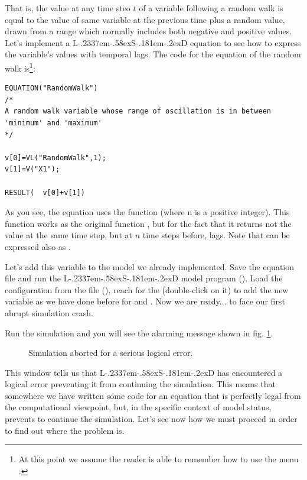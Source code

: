 \documentclass [11pt,a4paper] {book}
\def\LsD{{L\kern-.2337em\lower-.58ex\hbox{S}\kern-.181em\lower-.2ex\hbox{D}}\xspace}
\begin{document}
That is, the value at any time steo $t$ of a variable following a random walk is equal to the
value of same variable at the previous time plus a random value, drawn from a range which
normally includes both negative and positive values. Let's implement a \LsD equation to
see how to express the variable's values with temporal lags. The code for the equation of
the random walk is\footnote{At this point we assume the reader is able to remember how to
use the menu \menu{Insert \LsD Scripts}.}:


\small
\begin{verbatim}
EQUATION("RandomWalk")
/*
A random walk variable whose range of oscillation is in between
'minimum' and 'maximum'
*/

v[0]=VL("RandomWalk",1);
v[1]=V("X1");

RESULT(  v[0]+v[1])
\end{verbatim}
\normalsize

As you see, the equation uses the function  (where n is a positive
integer). This function works as the original function , but for the fact
that it returns not the value at the same time step, but at $n$ time steps before, lags. Note that  can be expressed also as
.

Let's add this variable to the model we already implemented. Save the equation file and run the \LsD model program (). Load the
configuration from the file (), reach for the  (double-click
on it) to add the new variable  as we have done before for  and
. Now we are ready... to face our first abrupt simulation crash.

Run the simulation and you will see the alarming message shown in fig. \ref{fig:abort}.


\begin{figure}[ht]
  \centering
  \caption{Simulation aborted for a serious logical error.}
  \label{fig:abort}
\end{figure}

This window tells us that \LsD has encountered a logical error preventing it from
continuing the simulation. This means that somewhere we have written some code for an
equation that is perfectly legal from the computational viewpoint, but, in the 
specific context of model status, prevents to continue the simulation. Let's see now how we must proceed in order to find out
where the problem is.
\end{document}
